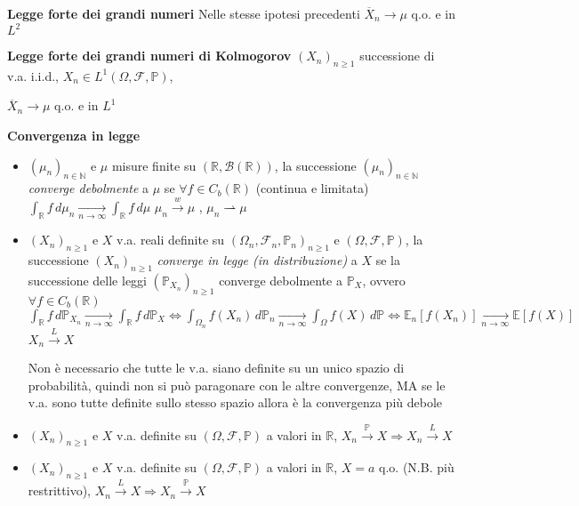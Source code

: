 \documentclass[openany]{book} %
\begin{document}
\textbf{Legge forte dei grandi numeri} Nelle stesse ipotesi precedenti $\overline {X}_n \rightarrow\mu$ q.o. e in $L^2$

\textbf{Legge forte dei grandi numeri di Kolmogorov} $(X_n)_{n\geq 1}$ successione di v.a. i.i.d., $X_n\in L^1(\Omega,\mathcal{F},\mathbb{P})$, 

$\overline {X}_n \rightarrow\mu$ q.o. e in $L^1$

\textbf{Convergenza in legge} 

\begin{itemize}

\item $(\mu_n)_{n\in \mathbb{N}}$ e $\mu$ misure finite su $(\mathbb{R},\mathcal{B}(\mathbb{R}))$, la successione $(\mu_n)_{n\in \mathbb{N}}$ \textit{converge debolmente} a $\mu$ se $\forall f \in C_b(\mathbb{R})$ (continua e limitata) $\int_{\mathbb{R}} f\,d\mu_n\underset {n \rightarrow\infty}\rightarrow\int_{\mathbb{R}}f\,d\mu$ \quad $\mu_n\overset w \rightarrow \mu$ , $\mu_n\rightharpoonup\mu$

\item $(X_n)_{n\geq 1}$ e $X$ v.a. reali definite su $(\Omega_n,\mathcal{F}_n,\mathbb{P}_n)_{n\geq 1}$ e $(\Omega,\mathcal{F},\mathbb{P})$, la successione $(X_n)_{n\geq 1}$ \textit{converge in legge (in distribuzione)} a $X$ se la successione delle leggi $(\mathbb{P}_{X_n})_{n\geq 1}$ converge debolmente a $\mathbb{P}_X$, ovvero $\forall f \in C_b(\mathbb{R})$ $\int_{\mathbb{R}}f\,d \mathbb{P}_{X_n}\underset{n \rightarrow\infty}{\rightarrow}\int_{\mathbb{R}}f\,d \mathbb{P}_X \Leftrightarrow \int_{\Omega_n}f(X_n)\,d \mathbb{P}_n\underset{n \rightarrow\infty}{\rightarrow}\int_{\Omega}f(X)\,d \mathbb{P} \Leftrightarrow \mathbb{E}_n[f(X_n)]\underset{n \rightarrow\infty}{\rightarrow}\mathbb{E}[f(X)]$ \quad $X_n \overset{L}{\rightarrow}X$

Non è necessario che tutte le v.a. siano definite su un unico spazio di probabilità, quindi non si può paragonare con le altre convergenze, MA se le v.a. sono tutte definite sullo stesso spazio allora è la convergenza più debole

\item $(X_n)_{n\geq 1}$ e $X$ v.a. definite su $(\Omega,\mathcal{F},\mathbb{P})$ a valori in $\mathbb{R}$, $X_n \overset{\mathbb{P}}{\rightarrow}X\Rightarrow X_n \overset{L}{\rightarrow}X$

\item $(X_n)_{n\geq 1}$ e $X$ v.a. definite su $(\Omega,\mathcal{F},\mathbb{P})$ a valori in $\mathbb{R}$, $X=a$ q.o. (N.B. più restrittivo), $X_n \overset{L}{\rightarrow}X\Rightarrow X_n \overset{\mathbb{P}}{\rightarrow}X$

\end{itemize}
\end{document}
